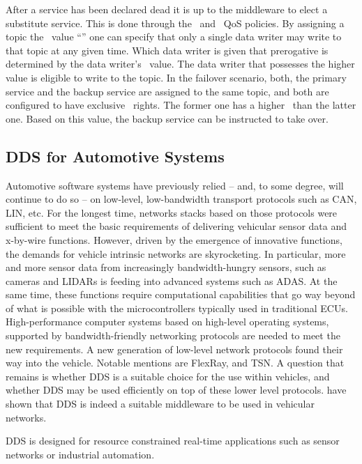 After a service has been declared dead it is up to the middleware to elect a substitute service. This is done through the \ownership\ and \ostrength\ QoS policies. By assigning a topic the \ownership\ value ``'' one can specify that only a single data writer may write to that topic at any given time. Which data writer is given that prerogative is determined by the data writer's \ostrength\ value. The data writer that possesses the higher value is eligible to write to the topic. In the failover scenario, both, the primary service and the backup service are assigned to the same topic, and both are configured to have exclusive \ownership\ rights. The former one has a higher \ostrength\ than the latter one. Based on this value, the backup service can be instructed to take over.


\subsection{DDS for Automotive Systems}
Automotive software systems have previously relied -- and, to some degree, will continue to do so -- on low-level, low-bandwidth transport protocols such as CAN, LIN, etc. For the longest time, networks stacks based on those protocols were sufficient to meet the basic requirements of delivering vehicular sensor data and x-by-wire functions. However, driven by the emergence of innovative functions, the demands for vehicle intrinsic networks are skyrocketing. In particular, more and more sensor data from increasingly bandwidth-hungry sensors, such as cameras and LIDARs is feeding into advanced systems such as ADAS. At the same time, these functions require computational capabilities that go way beyond of what is possible with the microcontrollers typically used in traditional ECUs. High-performance computer systems based on high-level operating systems, supported by bandwidth-friendly networking protocols are needed to meet the new requirements. A new generation of low-level network protocols found their way into the vehicle. Notable mentions are FlexRay, and TSN. A question that remains is whether DDS is a suitable choice for the use within vehicles, and whether DDS may be used efficiently on top of these lower level protocols. \citeauthor*{bouhouch2013dds} have shown \cite{bouhouch2013dds} that DDS is indeed a suitable middleware to be used in vehicular networks.


DDS is designed for resource constrained real-time applications such as sensor networks or industrial automation.


